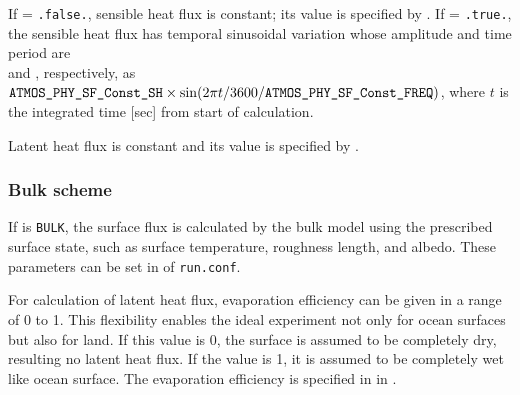 If  = \verb|.false.|, sensible heat flux is constant;
its value is specified by .
If  = \verb|.true.|, the sensible heat flux has temporal sinusoidal variation whose amplitude and time period are \\  and , respectively, as \\
$\nmitemeq{ATMOS_PHY_SF_Const_SH} \times \sin(2\pi t/3600/\nmitemeq{ATMOS_PHY_SF_Const_FREQ})$,
where $t$ is the integrated time [sec] from start of calculation.

Latent heat flux is constant and its value is specified by .



\subsubsection{Bulk scheme}
If  is \verb|BULK|, the surface flux is calculated by the bulk model using the prescribed surface state, such as surface temperature, roughness length, and albedo.
These parameters can be set in  of \verb|run.conf|.
%


For calculation of latent heat flux, evaporation efficiency can be given in a range of 0 to 1.
This flexibility enables the ideal experiment not only for ocean surfaces but also for land.
If this value is 0, the surface is assumed to be completely dry, resulting no latent heat flux.
If the value is 1, it is assumed to be completely wet like ocean surface.
The evaporation efficiency is specified in  in .



